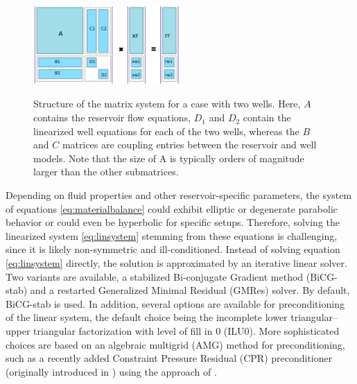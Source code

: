 \begin{figure}
\centering
{\includegraphics[width=0.5\textwidth]{figures/matrix_system}}
\caption{{\revised Structure} of the matrix system for a case with two
  wells. Here, $A$ contains the reservoir flow equations, $D_1$ and
  $D_2$ contain the linearized well equations for each of the two
  wells, whereas the $B$ and $C$ matrices are coupling entries between
  the reservoir and well models. {\revised Note that the size of A is typically
  orders of magnitude larger than the other submatrices.}}
\label{fig:matrix_system}
\end{figure}


Depending on fluid properties and other reservoir-specific parameters, the 
system of equations \eqref{eq:materialbalance} 
could exhibit elliptic or degenerate parabolic behavior or
could even be hyperbolic for specific setups. Therefore, solving the linearized
system \eqref{eq:linsystem} stemming from these equations is challenging, 
since it is likely non-symmetric and ill-conditioned. 
Instead of solving equation \eqref{eq:linsystem} directly, the solution is approximated 
by an iterative linear solver. Two variants are available, a 
stabilized Bi-conjugate Gradient method (BiCG-stab) {\revised \citep{bicgstab}}
and a restarted Generalized Minimal Residual (GMRes) {\revised \citep{gmres}}
solver. By default, BiCG-stab is used.
In addition, several options are available for preconditioning of the linear system, 
the default choice being the incomplete lower triangular--upper triangular factorization with level of fill in $0$ (ILU0).
More sophisticated choices are based on an algebraic multigrid (AMG) method for
preconditioning, such as a recently added 
Constraint Pressure Residual (CPR) preconditioner (originally introduced in
\cite{wallis:83}) using the approach of \citep{Scheichl2003Decoupling}.

